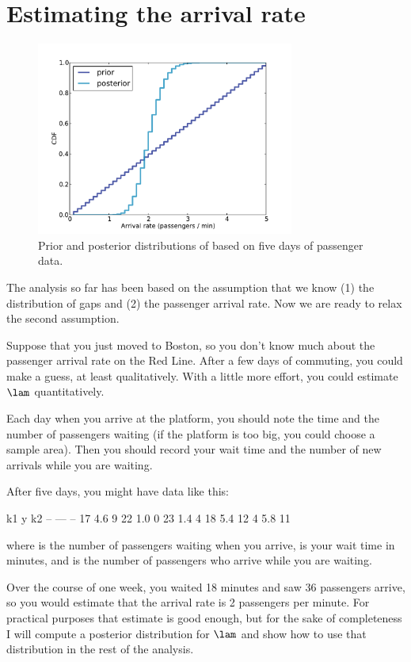 \documentclass[12pt]{book}
\theoremstyle{exercise}
\begin{document}
\section{Estimating the arrival rate}

\begin{figure}
\centerline{\includegraphics[height=2.5in]{figs/redline1.pdf}}
\caption{Prior and posterior distributions of  based
on five days of passenger data. }
\label{fig.redline1}
\end{figure}

The analysis so far has been based on the assumption that we know (1)
the distribution of gaps and (2) the passenger arrival rate.  Now we
are ready to relax the second assumption.

Suppose that you just moved to Boston, so you don't know much about
the passenger arrival rate on the Red Line.  After a few days of
commuting, you could make a guess, at least qualitatively.  With
a little more effort, you could estimate $\lam$ quantitatively.

Each day when you arrive at the platform, you should note the
time and the number of passengers waiting (if the platform is too
big, you could choose a sample area).  Then you should record your
wait time and the
number of new arrivals while you are waiting.

After five days, you might have data like this:
%
\begin{code}
k1      y     k2
--     ---    --
17     4.6     9
22     1.0     0
23     1.4     4
18     5.4    12
4      5.8    11
\end{code}
%
where  is the number of passengers waiting when you arrive,
 is your wait time in minutes, and  is the number of
passengers who arrive while you are waiting.

Over the course of one week, you waited 18 minutes and saw 36
passengers arrive, so you would estimate that the arrival rate is
2 passengers per minute.  For practical purposes that estimate is
good enough, but for the sake of completeness I
will compute a posterior distribution for $\lam$ and show how
to use that distribution in the rest of the analysis.
\end{document}
